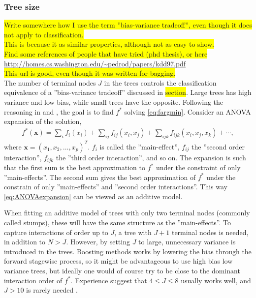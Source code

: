 \subsubsection{Tree size}
\label{sub:Tree size}
\colorbox{yellow}{Write somewhere how I use the term ''bias-variance tradeoff'', even though it does not apply to classification. }\\
\colorbox{yellow}{This is because it as similar properties, although not as easy to show.}\\
\colorbox{yellow}{Find some references of people that have tried (phd thesis), or here}\\
\url{http://homes.cs.washington.edu/~pedrod/papers/kdd97.pdf}\\ 
\colorbox{yellow}{This url is good, even though it was written for bagging.}\\
The number of terminal nodes $J$ in the trees controls the classification equivalence of a ''bias-variance tradeoff'' discussed in \colorbox{yellow}{section}. Large trees has high variance and low bias, while small trees have the opposite.   Following the reasoning in \cite{modstat} and \cite{friedman}, the goal is to find $f^*$ solving \eqref{eq:fargmin}. Consider an ANOVA expansion of the solution,
\begin{align}
  \label{eq:ANOVAexpansion} 
  f^*(\mathbf{x}) = \sum_{i} f_i(x_i) + \sum_{ij} f_{ij}(x_i, x_j) + 
  \sum_{ijk} f_{ijk}(x_i, x_j, x_k) + \cdots,
\end{align}
where $\mathbf{x} = (x_1, x_2, \ldots, x_p)^T$. $f_i$ is called the ''main-effect'', $f_{ij}$ the ''second order interaction'', $f_{ijk}$ the ''third order interaction'', and so on. The expansion is such that the first sum is the best approximation to $f^*$ under the constraint of only ''main-effects''. The second sum gives the best approximation of $f^*$ under the constrain of only ''main-effects'' and ''second order interactions''. This way \eqref{eq:ANOVAexpansion} can be viewed as an additive model. 

When fitting an additive model of trees with only two terminal nodes (commonly called stumps), these will have the same structure as the ''main-effects''. To capture interactions of order up to $J$, a tree with $J+1$  terminal nodes is needed, in addition to $N>J$. However, by setting $J$ to large, unnecessary variance is introduced in the trees. Boosting methods works by lowering the bias through the forward stagewise process, so it might be advantageous to use high bias low variance trees, but ideally one would of course try to be close to the dominant interaction order of $f^*$.
Experience suggest that $4 \leq J \leq 8$ usually works well, and $J>10$ is rarely needed \cite{modstat}.  


